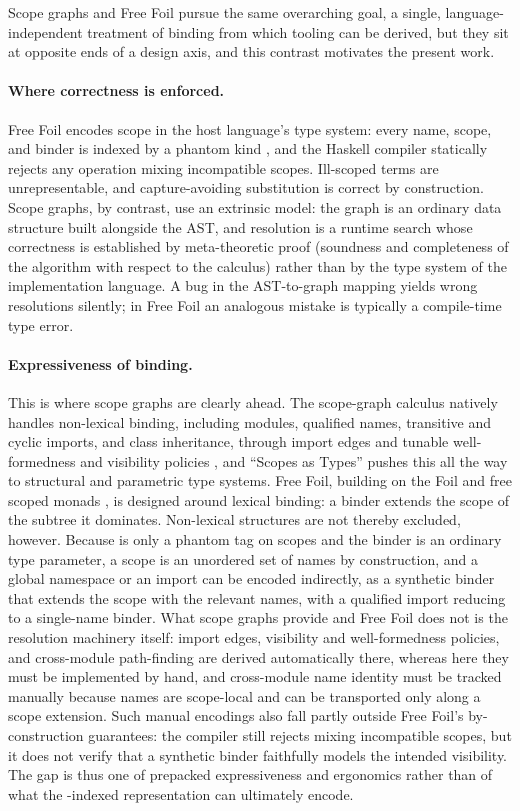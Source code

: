 Scope graphs and Free Foil pursue the same overarching goal, a single, language-independent treatment of binding from which tooling can be derived, but they sit at opposite ends of a design axis, and this contrast motivates the present work.

\paragraph{Where correctness is enforced.}
Free Foil encodes scope in the host language's type system: every name, scope, and binder is indexed by a phantom kind , and the Haskell compiler statically rejects any operation mixing incompatible scopes. 
Ill-scoped terms are unrepresentable, and capture-avoiding substitution is correct by construction. 
Scope graphs, by contrast, use an extrinsic model: the graph is an ordinary data structure built alongside the AST, and resolution is a runtime search whose correctness is established by meta-theoretic proof (soundness and completeness of the algorithm with respect to the calculus) rather than by the type system of the implementation language. 
A bug in the AST-to-graph mapping yields wrong resolutions silently; in Free Foil an analogous mistake is typically a compile-time type error.

\paragraph{Expressiveness of binding.}
This is where scope graphs are clearly ahead. 
The scope-graph calculus natively handles non-lexical binding, including modules, qualified names, transitive and cyclic imports, and class inheritance, through import edges and tunable well-formedness and visibility policies \cite{scopeGraphs2015}, and ``Scopes as Types'' \cite{scopesAsTypes2018} pushes this all the way to structural and parametric type systems. 
Free Foil, building on the Foil \cite{foil2023} and free scoped monads \cite{freemonads2024}, is designed around lexical binding: a binder extends the scope of the subtree it dominates. 
Non-lexical structures are not thereby excluded, however. 
Because  is only a phantom tag on scopes and the binder is an ordinary type parameter, a scope is an unordered set of names by construction, and a global namespace or an import can be encoded indirectly, as a synthetic binder that extends the scope with the relevant names, with a qualified import reducing to a single-name binder. 
What scope graphs provide and Free Foil does not is the resolution machinery itself: import edges, visibility and well-formedness policies, and cross-module path-finding are derived automatically there, whereas here they must be implemented by hand, and cross-module name identity must be tracked manually because names are scope-local and can be transported only along a scope extension. 
Such manual encodings also fall partly outside Free Foil's by-construction guarantees: the compiler still rejects mixing incompatible scopes, but it does not verify that a synthetic binder faithfully models the intended visibility. 
The gap is thus one of prepacked expressiveness and ergonomics rather than of what the -indexed representation can ultimately encode.

